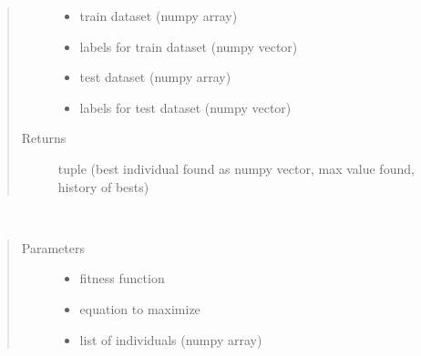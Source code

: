 \documentclass[letterpaper,10pt,english]{sphinxmanual}
\begin{document}
\begin{fulllineitems}
\begin{fulllineitems}
\begin{quote}
\begin{description}
\begin{itemize}
\item {} 
 \textendash{} train dataset (numpy array)

\item {} 
 \textendash{} labels for train dataset (numpy vector)

\item {} 
 \textendash{} test dataset (numpy array)

\item {} 
 \textendash{} labels for test dataset (numpy vector)

\end{itemize}

\item[{Returns}] \leavevmode
tuple (best individual found as numpy vector, max value found, history of bests)

\end{description}\end{quote}

\end{fulllineitems}


\begin{fulllineitems}
\label{\detokenize{index:genetic_optimizer.GeneticRegularizator.best_of_generation}}~\begin{quote}\begin{description}
\item[{Parameters}] \leavevmode\begin{itemize}
\item {} 
 \textendash{} fitness function

\item {} 
 \textendash{} equation to maximize

\item {} 
 \textendash{} list of individuals (numpy array)

\end{itemize}


\end{description}
\end{quote}
\end{fulllineitems}
\end{fulllineitems}
\end{document}
